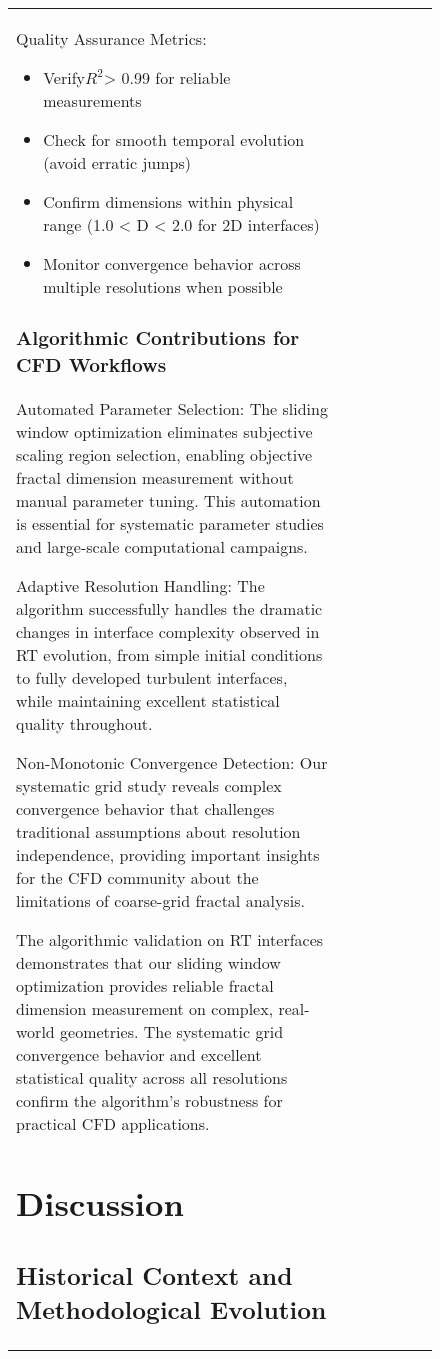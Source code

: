 \documentclass[preprint,12pt]{elsarticle}
\def\textbf#1{#1}%
\begin{document}
\begin{figure}[ht]
\begin{table}[ht]
\begin{tabular}{|l|c|c|c|c|c|c|}
\begin{table}[H]
\textbf{Quality Assurance Metrics}:
\begin{itemize}
\item Verify$R^2$> 0.99 for reliable measurements
\item Check for smooth temporal evolution (avoid erratic jumps)
\item Confirm dimensions within physical range (1.0 < D < 2.0 for 2D interfaces)
\item Monitor convergence behavior across multiple resolutions when possible
\end{itemize}

\subsubsection{Algorithmic Contributions for CFD Workflows}

\textbf{Automated Parameter Selection}: The sliding window optimization eliminates subjective scaling region selection, enabling objective fractal dimension measurement without manual parameter tuning. This automation is essential for systematic parameter studies and large-scale computational campaigns.

\textbf{Adaptive Resolution Handling}: The algorithm successfully handles the dramatic changes in interface complexity observed in RT evolution, from simple initial conditions to fully developed turbulent interfaces, while maintaining excellent statistical quality throughout.

\textbf{Non-Monotonic Convergence Detection}: Our systematic grid study reveals complex convergence behavior that challenges traditional assumptions about resolution independence, providing important insights for the CFD community about the limitations of coarse-grid fractal analysis.

The algorithmic validation on RT interfaces demonstrates that our sliding window optimization provides reliable fractal dimension measurement on complex, real-world geometries. The systematic grid convergence behavior and excellent statistical quality across all resolutions confirm the algorithm's robustness for practical CFD applications.


\section{Discussion}
\label{sec:discussion}

\subsection{Historical Context and Methodological Evolution}


\end{table}
\end{tabular}
\end{table}
\end{figure}
\end{document}

